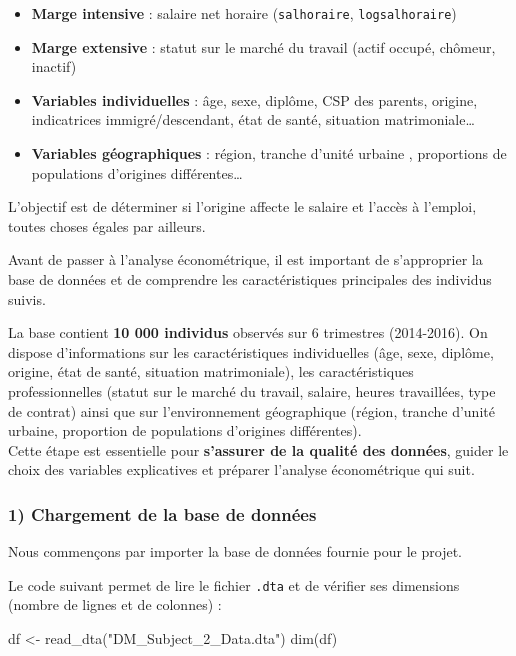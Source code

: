 \documentclass[
  letterpaper,
  DIV=11,
  numbers=noendperiod]{scrartcl}
\newenvironment{Shaded}{\begin{snugshade}}{\end{snugshade}}
\newcommand{\FunctionTok}[1]{\textcolor[rgb]{0.28,0.35,0.67}{#1}}
\newcommand{\NormalTok}[1]{\textcolor[rgb]{0.00,0.23,0.31}{#1}}
\newcommand{\OtherTok}[1]{\textcolor[rgb]{0.00,0.23,0.31}{#1}}
\newcommand{\StringTok}[1]{\textcolor[rgb]{0.13,0.47,0.30}{#1}}
\providecommand{\tightlist}{%
  \setlength{\itemsep}{0pt}\setlength{\parskip}{0pt}}
\begin{document}
\begin{itemize}
\tightlist
\item
  \textbf{Marge intensive} : salaire net horaire (\texttt{salhoraire},
  \texttt{logsalhoraire})
\item
  \textbf{Marge extensive} : statut sur le marché du travail (actif
  occupé, chômeur, inactif)
\item
  \textbf{Variables individuelles} : âge, sexe, diplôme, CSP des
  parents, origine, indicatrices immigré/descendant, état de santé,
  situation matrimoniale\ldots{}
\item
  \textbf{Variables géographiques} : région, tranche d'unité urbaine ,
  proportions de populations d'origines différentes\ldots{}
\end{itemize}

L'objectif est de déterminer si l'origine affecte le salaire et l'accès
à l'emploi, toutes choses égales par ailleurs.

Avant de passer à l'analyse économétrique, il est important de
s'approprier la base de données et de comprendre les caractéristiques
principales des individus suivis.

La base contient \textbf{10 000 individus} observés sur 6 trimestres
(2014-2016). On dispose d'informations sur les caractéristiques
individuelles (âge, sexe, diplôme, origine, état de santé, situation
matrimoniale), les caractéristiques professionnelles (statut sur le
marché du travail, salaire, heures travaillées, type de contrat) ainsi
que sur l'environnement géographique (région, tranche d'unité urbaine,
proportion de populations d'origines différentes).\\
Cette étape est essentielle pour \textbf{s'assurer de la qualité des
données}, guider le choix des variables explicatives et préparer
l'analyse économétrique qui suit.

\subsubsection{1) Chargement de la base de
données}\label{chargement-de-la-base-de-donnuxe9es}

Nous commençons par importer la base de données fournie pour le projet.

Le code suivant permet de lire le fichier \texttt{.dta} et de vérifier
ses dimensions (nombre de lignes et de colonnes) :

\begin{Shaded}
\begin{Highlighting}[]
\NormalTok{df }\OtherTok{\textless{}{-}} \FunctionTok{read\_dta}\NormalTok{(}\StringTok{"DM\_Subject\_2\_Data.dta"}\NormalTok{)}
\FunctionTok{dim}\NormalTok{(df)  }
\end{Highlighting}
\end{Shaded}
\end{document}
